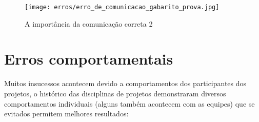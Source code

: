 \begin{figure}
    \centering
	\texttt{[image: erros/erro\_de\_comunicacao\_gabarito\_prova.jpg]}
    \caption{A importância da comunicação correta 2}
    \label{fig:gabarito-prova}
\end{figure}



\section{Erros comportamentais}

Muitos insucessos acontecem devido a comportamentos dos participantes dos projetos, o histórico das disciplinas de projetos demonstraram diversos comportamentos individuais (alguns também acontecem com as equipes) que se evitados permitem melhores resultados:

